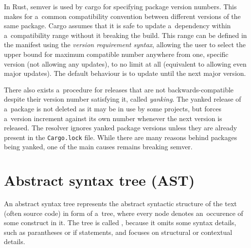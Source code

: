 \documentclass[licencjacka,en]{pracamgr}
\begin{document}
In Rust, semver is used by cargo for specifying package version numbers. This makes for a~common
compatibility convention between different versions of the same package. Cargo assumes that
it is safe to update a~dependency within a~compatibility range without it breaking the build.
This range can be defined in the manifest using the \textit{version requirement syntax}, allowing
the user to select the upper bound for maximum compatible number anywhere from one, specific
version (not allowing any updates), to no limit at all (equivalent to allowing even major updates).
The default behaviour is to update until the next major version.


There also exists a~procedure for releases that are not backwards-compatible despite their version
number satisfying it, called \textit{yanking}. The yanked release of a~package is not
deleted as it may be in use by some projects, but forces a~version increment against its own number
whenever the next version is released. The resolver ignores yanked package versions unless they are
already present in the \texttt{Cargo.lock} file. While there are many reasons behind packages being
yanked, one of the main causes remains breaking semver.

\section{Abstract syntax tree (AST)}\label{r:section_ast}

An abstract syntax tree represents the abstract syntactic structure of the text (often source code)
in form of a~tree, where every node denotes an~occurence of some construct in it. The tree is
called , because it omits some syntax details, such as parantheses or if statements,
and focuses on structural or contextual details.
\end{document}
